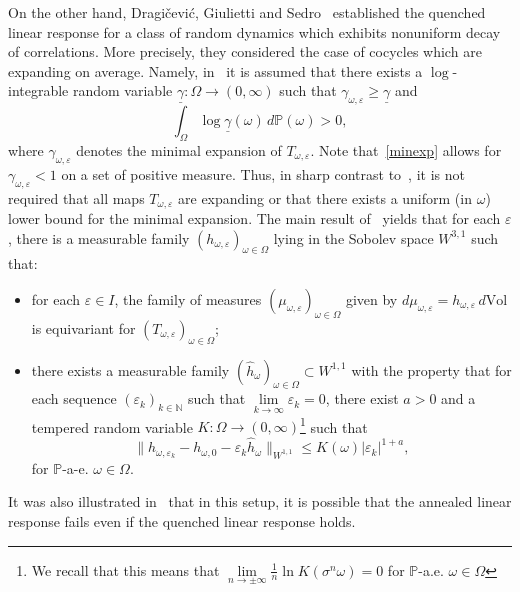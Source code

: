 \documentclass[11pt,reqno,a4paper]{article}
\theoremstyle{special}
\def\N{\mathbb{N}}
\def\om{\omega}
\begin{document}
On the other hand, Dragi\v cevi\' c, Giulietti and Sedro~\cite{DGS} established the quenched linear response for a class of random dynamics which exhibits nonuniform decay of correlations. 
 More precisely, they considered the case of cocycles which are expanding on average. Namely, 
 in~\cite{DGS} it is assumed that there exists a $\log$-integrable random variable $\underline{\gamma} \colon \Omega \to (0, \infty)$ such that $\gamma_{\om, \varepsilon} \ge \underline{\gamma}$ and 
\begin{equation}\label{minexp}
\int_\Omega \log \underline{\gamma}(\om) \, d\mathbb P(\om)>0,
\end{equation}
where $\gamma_{\om, \varepsilon}$ denotes the minimal expansion of $T_{\om, \varepsilon}$.  Note that~\eqref{minexp} allows for $\gamma_{\om, \varepsilon}<1$ on a set of positive measure. Thus, in sharp contrast to~\cite{RS}, it is not required that all maps $T_{\om, \varepsilon}$ are expanding or that there exists a uniform (in $\om$) lower bound for the minimal expansion. The main result of~\cite{DGS} yields that for each $\varepsilon$, there is a measurable  family $(h_{\omega, \varepsilon})_{\om \in \Omega}$ lying in the Sobolev space $W^{3, 1}$  such that:
\begin{itemize}
\item for each $\varepsilon \in I$, the family of measures $(\mu_{\om, \varepsilon})_{\om \in \Omega}$ given by $d\mu_{\om, \varepsilon}=h_{\om, \varepsilon}\, d\text{Vol}$ is equivariant for $(T_{\om, \varepsilon})_{\om \in \Omega}$;
\item there exists a measurable family $(\hat h_\om)_{\om \in \Omega}\subset W^{1, 1}$ with the property that for each sequence $(\varepsilon_k)_{k\in \N}$ such that $\lim\limits_{k\to \infty}\varepsilon_k=0$, there exist $a>0$ and a tempered random variable $K\colon \Omega \to (0, \infty)$\footnote{We recall that this means that $\lim\limits_{n\to \pm \infty} \frac 1 n \ln K(\sigma^n \om)=0$ for $\mathbb P$-a.e. $\om \in \Omega$} such that 
\begin{equation}\label{oldln}
\|h_{\om, \varepsilon_k}-h_{\om, 0}-\varepsilon_k \hat h_\om\|_{W^{1, 1}}\le K(\om)|\varepsilon_k|^{1+a},
\end{equation}
for $\mathbb P$-a-e. $\om  \in \Omega$.
\end{itemize}
It was also illustrated in~\cite[Appendix A]{DGS} that in this setup, it is possible that the annealed linear response fails even if the quenched linear response holds. 
\end{document}
